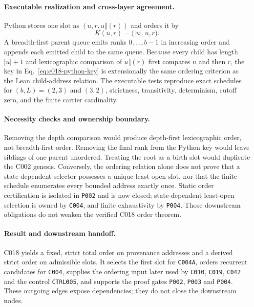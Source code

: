 \paragraph*{Executable realization and cross-layer agreement.}
Python stores one slot as $(u,r,u\mathbin{\Vert}(r))$ and orders it by
\begin{equation}
  K(u,r)=\bigl(|u|,u,r\bigr).
  \label{eq:c018-python-key}
\end{equation}
A breadth-first parent queue emits ranks $0,\ldots,b-1$ in increasing order
and appends each emitted child to the same queue.  Because every child has
length $|u|+1$ and lexicographic comparison of $u\mathbin{\Vert}(r)$ first
compares $u$ and then $r$, the key in Eq.~\eqref{eq:c018-python-key} is
extensionally the same ordering criterion as the Lean child-address relation.
The executable tests reproduce exact schedules for $(b,L)=(2,3)$ and $(3,2)$,
strictness, transitivity, determinism, cutoff zero, and the finite carrier
cardinality.

\paragraph*{Necessity checks and ownership boundary.}
Removing the depth comparison would produce depth-first lexicographic order,
not breadth-first order.  Removing the final rank from the Python key would
leave siblings of one parent unordered.  Treating the root as a birth slot
would duplicate the C002 genesis.  Conversely, the ordering relation alone does not prove that a state-dependent
selector possesses a unique least open slot, nor that the finite schedule
enumerates every bounded address exactly once.  Static order certification is
isolated in \texttt{P002} and is now closed; state-dependent least-open
selection is owned by \texttt{C004}, and finite exhaustivity by \texttt{P004}.
Those downstream obligations do not weaken the verified C018 order theorem.

\paragraph*{Result and downstream handoff.}
C018 yields a fixed, strict total order on provenance addresses and a derived
strict order on admissible slots.  It selects the first slot for
\texttt{C004A}, orders recurrent candidates for \texttt{C004}, supplies the
ordering input later used by \texttt{C010}, \texttt{C019}, \texttt{C042} and
the control \texttt{CTRL005}, and supports the proof gates \texttt{P002},
\texttt{P003} and \texttt{P004}.  These outgoing edges expose dependencies;
they do not close the downstream nodes.

